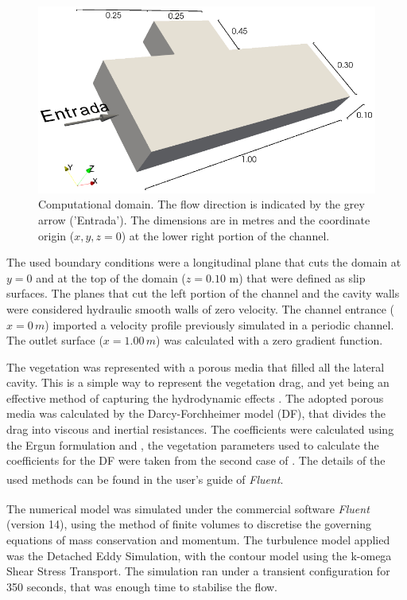 \begin{figure}[!ht]
\centering
\includegraphics[width=\linewidth]{../images/art2/imgHyd1.png}
\caption{Computational domain. The flow direction is indicated by the grey arrow ('Entrada'). The dimensions are in metres and the coordinate origin ($x, y, z = 0$) at the lower right portion of the channel.}
\label{fig:art2:compDomain}
\end{figure}
The used boundary conditions were a longitudinal plane that cuts the domain at $y=0$ and at the top of the domain ($z=0.10$ m) that were defined as slip surfaces. The planes that cut the left portion of the channel and the cavity walls were considered hydraulic smooth walls of zero velocity. The channel entrance ($x=0\,m$) imported a velocity profile previously simulated in a periodic channel. The outlet surface ($x=1.00\,m$) was calculated with a zero gradient function.

The vegetation was represented with a porous media that filled all the lateral cavity. This is a simple way to represent the vegetation drag, and yet being an effective method of capturing the hydrodynamic effects \cite{Yamasaki2019}.  The adopted porous media was calculated by the Darcy-Forchheimer model (DF), that divides the drag into viscous and inertial resistances. The coefficients were calculated using the Ergun formulation and \textcite{Sonnenwald2017}, the vegetation parameters used to calculate the coefficients for the DF were taken from the second case of \textcite{xiang2019}. The details of the used methods can be found in the user's guide of \textit{Fluent}\textsuperscript{\textregistered}.

The numerical model was simulated under the commercial software \textit{Fluent}\textsuperscript{\textregistered} (version 14), using the method of finite volumes to discretise the governing equations of mass conservation and momentum. The turbulence model applied was the Detached Eddy Simulation, with the contour model using the k-omega Shear Stress Transport. The simulation ran under a transient configuration for 350 seconds, that was enough time to stabilise the flow.
